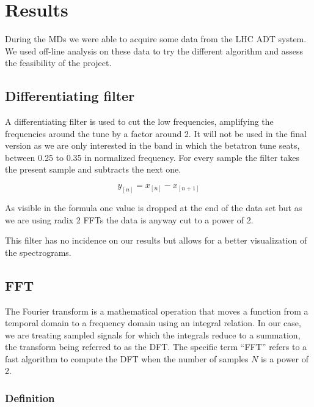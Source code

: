 %

\glsresetall
\chapter{Results}

During the \glspl{MD} we were able to acquire some data from the \gls{LHC} \gls{ADT} system. We used off-line analysis on these data to try the different algorithm and assess the feasibility of the project.

\section{Differentiating filter}
\label{sec:notch}

A differentiating filter is used to cut the low frequencies, amplifying the frequencies around the tune by a factor around 2. It will not be used in the final version as we are only interested in the band in which the betatron tune seats, between 0.25 to 0.35 in normalized frequency. For every sample the filter takes the present sample and subtracts the next one. 

$$y_{[n]} = x_{[n]} - x_{[n + 1]}$$

As visible in the formula one value is dropped at the end of the data set but as we are using radix 2 \glspl{FFT} the data is anyway cut to a power of 2.

This filter has no incidence on our results but allows for a better visualization of the spectrograms.

\section{FFT}
\label{sec:FFT}

The Fourier transform is a mathematical operation that moves a function from a temporal domain to a frequency domain using an integral relation. In our case, we are treating sampled signals for which the integrals reduce to a summation, the transform being referred to as the \gls{DFT}. The specific term ``\gls{FFT}'' refers to a fast algorithm to compute the \gls{DFT} when the number of samples $N$ is a power of 2.

\subsection{Definition}

